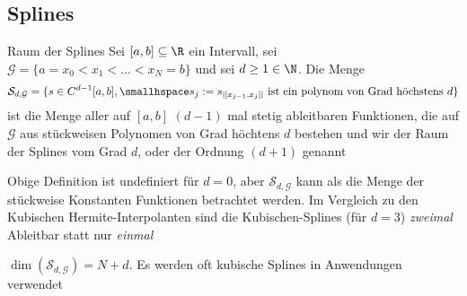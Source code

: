 \newsectionNoPB
\subsection{Splines}
\begin{definition}[]{Raum der Splines}
    Sei $[a, b] \subseteq \R$ ein Intervall, sei $\mathcal{G} = \{ a = x_0 < x_1 < \ldots < x_N = b \}$ und sei $d \geq 1 \in \N$.
    Die Menge
    \begin{align*}
        \mathcal{S}_{d, \mathcal{G}} = \{ s \in C^{d - 1}[a, b], \smallhspace s_j := s_{|[x_{j - 1}, x_j]|} \text{ ist ein polynom von Grad höchstens } d \}
    \end{align*}
    ist die Menge aller auf $[a, b]$ $(d - 1)$ mal stetig ableitbaren Funktionen, die auf $\mathcal{G}$ aus stückweisen Polynomen von Grad höchtens $d$ bestehen
    und wir der Raum der Splines vom Grad $d$, oder der Ordnung $(d + 1)$ genannt
\end{definition}

\inlineremark Obige Definition ist undefiniert für $d = 0$, aber $\mathcal{S}_{d, \mathcal{G}}$ kann als die Menge der stückweise Konstanten Funktionen betrachtet werden.
Im Vergleich zu den Kubischen Hermite-Interpolanten sind die Kubischen-Splines (für $d = 3$) \textit{zweimal} Ableitbar statt nur \textit{einmal}

\inlineremark $\dim(\mathcal{S}_{d, \mathcal{G}}) = N + d$. Es werden oft kubische Splines in Anwendungen verwendet
